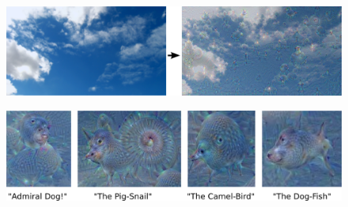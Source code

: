 \documentclass[mathserif]{beamer}
\begin{document}
\begin{frame}{}
\begin{figure}
\includegraphics[width=\textwidth]{skyarrow_google}
\caption*{}
\end{figure}
\end{frame}

\begin{frame}{}
\begin{figure}
\includegraphics[width=\textwidth]{funny-animals_google}
\caption*{}
\end{figure}
\end{frame}
\end{document}
